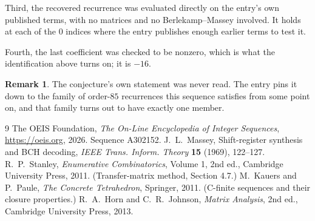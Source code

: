 \documentclass[11pt,a4paper]{article}
\theoremstyle{plain}
\theoremstyle{definition}
\newtheorem{remark}[theorem]{Remark}
\begin{document}
Third, the recovered recurrence was evaluated directly on the entry's own published terms, with
no matrices and no Berlekamp--Massey involved. It holds at each of the $0$ indices where
the entry publishes enough earlier terms to test it.

Fourth, the last coefficient was checked to be nonzero, which is what the identification above
turns on; it is $-16$.

\begin{remark}
The conjecture's own statement was never read. The entry pins it down to the family of
order-$85$ recurrences this sequence satisfies from some point on, and that family turns
out to have exactly one member.
\end{remark}

\begin{thebibliography}{9}
 The OEIS Foundation, \emph{The On-Line Encyclopedia of Integer
Sequences}, \url{https://oeis.org}, 2026. Sequence A302152.
 J.~L.~Massey, Shift-register synthesis and BCH decoding, \emph{IEEE
Trans. Inform. Theory} \textbf{15} (1969), 122--127.
 R.~P.~Stanley, \emph{Enumerative Combinatorics}, Volume 1, 2nd ed.,
Cambridge University Press, 2011. (Transfer-matrix method, Section 4.7.)
 M.~Kauers and P.~Paule, \emph{The Concrete Tetrahedron}, Springer, 2011.
(C-finite sequences and their closure properties.)
 R.~A.~Horn and C.~R.~Johnson, \emph{Matrix Analysis}, 2nd ed., Cambridge
University Press, 2013.
\end{thebibliography}
\end{document}
